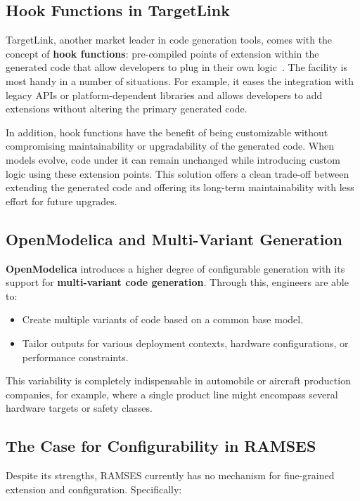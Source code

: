 \subsection*{Hook Functions in TargetLink}

TargetLink, another market leader in code generation tools, comes with the concept of \textbf{hook functions}: pre-compiled points of extension within the generated code that allow developers to plug in their own logic~\cite{target_link_features}. The facility is most handy in a number of situations. For example, it eases the integration with legacy APIs or platform-dependent libraries and allows developers to add extensions without altering the primary generated code.
\par
In addition, hook functions have the benefit of being customizable without compromising maintainability or upgradability of the generated code. When models evolve, code under it can remain unchanged while introducing custom logic using these extension points. This solution offers a clean trade-off between extending the generated code and offering its long-term maintainability with less effort for future upgrades.

\subsection*{OpenModelica and Multi-Variant Generation}

\textbf{OpenModelica} introduces a higher degree of configurable generation with its support for \textbf{multi-variant code generation}. Through this, engineers are able to:
\begin{itemize} 
	\item Create multiple variants of code based on a common base model.
	\item Tailor outputs for various deployment contexts, hardware configurations, or performance constraints.
\end{itemize}

This variability is completely indispensable in automobile or aircraft production companies, for example, where a single product line might encompass several hardware targets or safety classes.


\subsection*{The Case for Configurability in RAMSES}

Despite its strengths, RAMSES currently has no mechanism for fine-grained extension and configuration.
Specifically:


